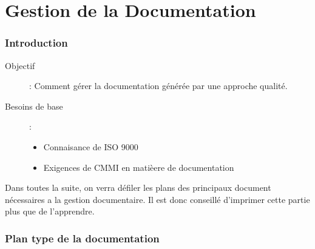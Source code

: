 \part{Gestion de la Documentation}

\section{Introduction}

\begin{description}
\item[Objectif] : Comment gérer la documentation générée par une approche qualité.
\item[Besoins de base] :
	\begin{itemize}
	\item Connaisance de ISO 9000
	\item Exigences de CMMI en matièere de documentation
	\end{itemize}
\end{description}

Dans toutes la suite, on verra défiler les plans des principaux document nécessaires a la gestion documentaire. Il est donc conseillé d’imprimer cette partie plus que de l’apprendre.

\section{Plan type de la documentation}


